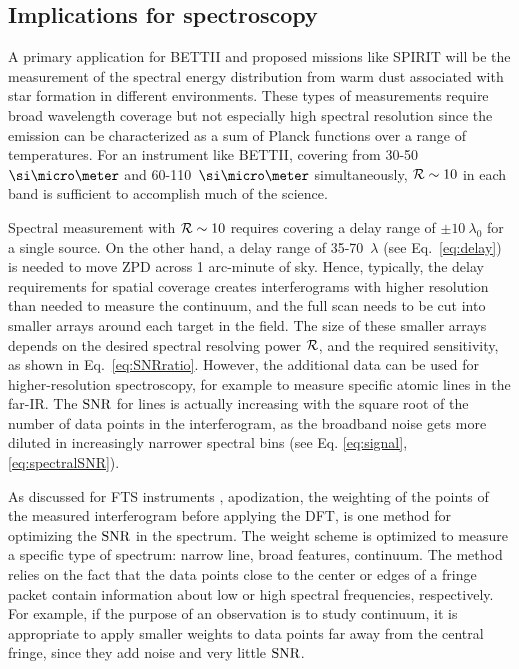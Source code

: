 \subsection{Implications for spectroscopy}
A primary application for BETTII and proposed missions like SPIRIT will be the measurement of the spectral energy distribution
from warm dust associated with star formation in different environments. These types of measurements require broad wavelength
coverage but not especially high spectral resolution since the emission can be characterized as a sum of Planck functions over
a range of temperatures. For an instrument like BETTII, covering from 30-50~$\um$ and 60-110~$\um$ simultaneously,
$\mathcal{R}\sim 10$ in each band is sufficient to accomplish much of the science.

Spectral measurement with $\mathcal{R}\sim 10$ requires covering a delay range of $\pm 10~\lambda_0$ for a single source. On the other
hand, a delay range of 35-70~$\lambda$ (see Eq.~\ref{eq:delay}) is needed to move ZPD across 1 arc-minute of sky. Hence, typically,
the delay requirements for spatial coverage creates interferograms with higher resolution than needed to measure the continuum, and the full scan needs to be cut into smaller arrays around each target in the field. The size of these smaller arrays depends on the desired spectral resolving power $\mathcal{R}$, and the required sensitivity, as shown in Eq.~\ref{eq:SNRratio}. However, the additional data can be used for higher-resolution spectroscopy, for example to measure specific atomic lines in the far-IR. The $\textrm{SNR}$ for lines is actually increasing with the square root of the number of data points in the interferogram, as the broadband noise gets more diluted in increasingly narrower spectral bins (see Eq. \ref{eq:signal}, \ref{eq:spectralSNR}). 


As discussed for FTS instruments \citep[e.g.][]{Davis:2001tr},
apodization, the weighting of the points of the measured interferogram before applying the DFT, is one method for optimizing the $\textrm{SNR}$
in the spectrum.
 The weight scheme is optimized to measure a specific type of spectrum: narrow line, broad features, continuum. 
The method relies on the fact that the data points close to the center or edges of a fringe packet contain information about low or high spectral frequencies, respectively. For example, if the purpose of an observation is to study continuum, it is appropriate to apply smaller weights to data points far away from the central fringe, since they add noise and very little $\textrm{SNR}$. 

